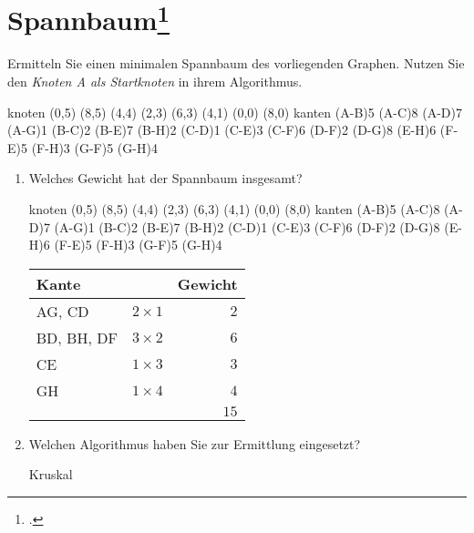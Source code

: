 \documentclass{lehramt-informatik}
\begin{document}
\section{Spannbaum\footcite[Aufgabe 6]{aud:e-klausur}}

Ermitteln Sie einen minimalen Spannbaum des vorliegenden Graphen. Nutzen
Sie den \emph{Knoten A als Startknoten} in ihrem Algorithmus.

\graph knoten {
  (0,5)
  (8,5)
  (4,4)
  (2,3)
  (6,3)
  (4,1)
  (0,0)
  (8,0)
} kanten {
  \kante(A-B){5}
  \kante(A-C){8}
  \kante(A-D){7}
  \kante(A-G){1}
  \kante(B-C){2}
  \kante(B-E){7}
  \kante(B-H){2}
  \kante(C-D){1}
  \kante(C-E){3}
  \kante(C-F){6}
  \kante(D-F){2}
  \kante(D-G){8}
  \kante(E-H){6}
  \kante(F-E){5}
  \kante(F-H){3}
  \kante(G-F){5}
  \kante(G-H){4}
}

\begin{enumerate}
\item Welches Gewicht hat der Spannbaum insgesamt?

\begin{antwort}
\graph knoten {
  (0,5)
  (8,5)
  (4,4)
  (2,3)
  (6,3)
  (4,1)
  (0,0)
  (8,0)
} kanten {
  \kante(A-B){5}
  \kante(A-C){8}
  \kante(A-D){7}
  \KANTE(A-G){1}
  \KANTE(B-C){2}
  \kante(B-E){7}
  \KANTE(B-H){2}
  \KANTE(C-D){1}
  \KANTE(C-E){3}
  \kante(C-F){6}
  \KANTE(D-F){2}
  \kante(D-G){8}
  \kante(E-H){6}
  \kante(F-E){5}
  \kante(F-H){3}
  \kante(G-F){5}
  \KANTE(G-H){4}
}

\begin{center}
\begin{tabular}{|l|l|r|}
\hline
Kante & & Gewicht\\\hline\hline
AG, CD     & $2 \times 1$ & $2$\\
BD, BH, DF & $3 \times 2$ & $6$\\
CE         & $1 \times 3$ & $3$\\
GH         & $1 \times 4$ & $4$\\\hline
           &              & $15$\\\hline
\end{tabular}
\end{center}
\end{antwort}

\item Welchen Algorithmus haben Sie zur Ermittlung eingesetzt?

\begin{antwort}
Kruskal
\end{antwort}
\end{enumerate}

\literatur
\end{document}
